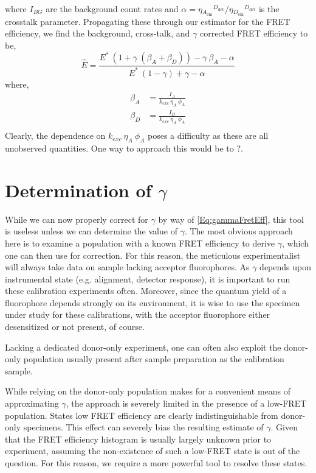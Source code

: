 \documentclass{article}
\newcommand{\emm}[1]{\ensuremath{_{#1_\mathrm{em}}}}   %
\newcommand{\dt}[1]{\ensuremath{^{#1_\mathrm{det}}}}   %
\begin{document}
where $I_{BG}$ are the background count rates and $\alpha =
\eta\emm{A}\dt{D} / \eta\emm{D}\dt{D}$ is the crosstalk
parameter. Propagating these through our estimator for the FRET
efficiency, we find the background, cross-talk, and $\gamma$ corrected
FRET efficiency to be,
\[
  \hat E = \frac{E^* ~ \left(1 + \gamma ~ (\beta_A + \beta_D)\right) - \gamma~\beta_A - \alpha}
    {E^* ~ (1 - \gamma) + \gamma - \alpha}
\]
where,
\begin{align*}
  \beta_A & = \frac{I_A}{k_{exc}~\eta_A~\phi_A} \\
  \beta_D & = \frac{I_D}{k_{exc}~\eta_A~\phi_A} \\
\end{align*}
Clearly, the dependence on $k_{exc}~\eta_A~\phi_A$ poses a difficulty
as these are all unobserved quantities. One way to approach this would
be to ?.

\section{Determination of $\gamma$}
While we can now properly correct for $\gamma$ by way of
\eqref{Eq:gammaFretEff}, this tool is useless unless we can determine
the value of $\gamma$. The most obvious approach here is to examine a
population with a known FRET efficiency to derive $\gamma$, which one
can then use for correction. For this reason, the meticulous
experimentalist will always take data on sample lacking acceptor
fluorophores. As $\gamma$ depends upon instrumental state
(e.g. alignment, detector response), it is important to run these
calibration experiments often. Moreover, since the quantum yield of a
fluorophore depends strongly on its environment, it is wise to use the
specimen under study for these calibrations, with the acceptor
fluorophore either desensitized or not present, of course.

Lacking a dedicated donor-only experiment, one can often also
exploit the donor-only population usually present after sample
preparation as the calibration sample.

While relying on the donor-only population makes for a convenient
means of approximating $\gamma$, the approach is severely limited in
the presence of a low-FRET population. States low FRET efficiency are
clearly indistinguishable from donor-only specimens. This effect can
severely bias the resulting estimate of $\gamma$. Given that the FRET
efficiency histogram is usually largely unknown prior to experiment,
assuming the non-existence of such a low-FRET state is out of the
question. For this reason, we require a more powerful tool to resolve
these states.
\end{document}

